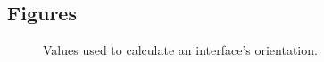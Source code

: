 \documentclass{bmcart}
\begin{document}
\begin{backmatter}




\section*{Figures}

\begin{figure}[h!]
   \centering
   \caption{
   Values used to calculate an interface's orientation.}
   \label{fig:orienTrig}
\end{figure}


\end{backmatter}
\end{document}
